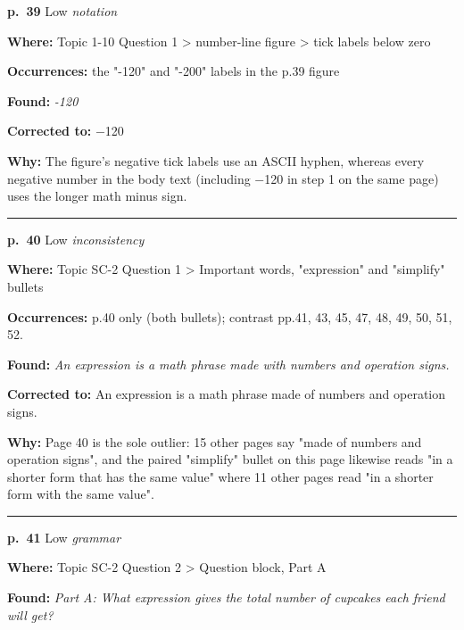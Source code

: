 \documentclass[11pt]{article}
\newcommand{\sevlow}[1]{\textcolor{black!55}{#1}}
\begin{document}
\noindent\textbf{p.~39} \quad \sevlow{Low} \quad \textit{notation}\par
\noindent\textbf{Where: }Topic 1-10 Question 1 > number-line figure > tick labels below zero\par
\noindent\textbf{Occurrences: }the "-120" and "-200" labels in the p.39 figure\par
\noindent\textbf{Found: }\textit{-120}\par
\noindent\textbf{Corrected to: }$-$120\par
\noindent\textbf{Why: }The figure's negative tick labels use an ASCII hyphen, whereas every negative number in the body text (including $-$120 in step 1 on the same page) uses the longer math minus sign.\par\vspace{4pt}
\noindent\rule{\textwidth}{0.4pt}\par\nobreak\vspace{2pt}
\noindent\textbf{p.~40} \quad \sevlow{Low} \quad \textit{inconsistency}\par
\noindent\textbf{Where: }Topic SC-2 Question 1 > Important words, "expression" and "simplify" bullets\par
\noindent\textbf{Occurrences: }p.40 only (both bullets); contrast pp.41, 43, 45, 47, 48, 49, 50, 51, 52.\par
\noindent\textbf{Found: }\textit{An expression is a math phrase made with numbers and operation signs.}\par
\noindent\textbf{Corrected to: }An expression is a math phrase made of numbers and operation signs.\par
\noindent\textbf{Why: }Page 40 is the sole outlier: 15 other pages say "made of numbers and operation signs", and the paired "simplify" bullet on this page likewise reads "in a shorter form that has the same value" where 11 other pages read "in a shorter form with the same value".\par\vspace{4pt}
\noindent\rule{\textwidth}{0.4pt}\par\nobreak\vspace{2pt}
\noindent\textbf{p.~41} \quad \sevlow{Low} \quad \textit{grammar}\par
\noindent\textbf{Where: }Topic SC-2 Question 2 > Question block, Part A\par
\noindent\textbf{Found: }\textit{Part A: What expression gives the total number of cupcakes each friend will get?}\par
\end{document}

